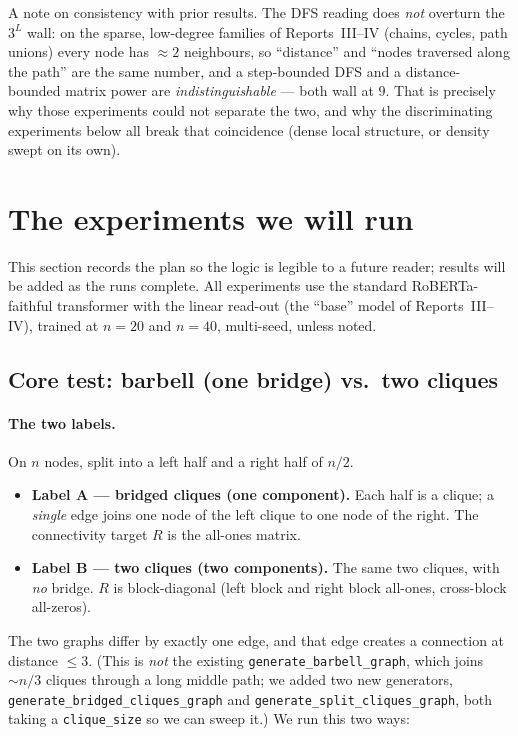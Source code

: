 \documentclass[11pt,a4paper]{article}
\begin{document}
A note on consistency with prior results. The DFS reading does \emph{not} overturn the $3^L$
wall: on the sparse, low-degree families of Reports~III--IV (chains, cycles, path unions) every
node has $\approx 2$ neighbours, so ``distance'' and ``nodes traversed along the path'' are the
same number, and a step-bounded DFS and a distance-bounded matrix power are
\emph{indistinguishable} --- both wall at $9$. That is precisely why those experiments could not
separate the two, and why the discriminating experiments below all break that coincidence
(dense local structure, or density swept on its own).

\section{The experiments we will run}
\label{sec:plan}

This section records the plan so the logic is legible to a future reader; results will be added
as the runs complete. All experiments use the standard RoBERTa-faithful transformer with the
linear read-out (the ``base'' model of Reports~III--IV), trained at $n=20$ and $n=40$, multi-seed,
unless noted.

\subsection{Core test: barbell (one bridge) vs.\ two cliques}
\label{sec:plan-barbell}

\paragraph{The two labels.} On $n$ nodes, split into a left half and a right half of $n/2$.
\begin{itemize}\setlength\itemsep{0.1em}
  \item \textbf{Label A --- bridged cliques (one component).} Each half is a clique; a
        \emph{single} edge joins one node of the left clique to one node of the right. The
        connectivity target $R$ is the all-ones matrix.
  \item \textbf{Label B --- two cliques (two components).} The same two cliques, with
        \emph{no} bridge. $R$ is block-diagonal (left block and right block all-ones,
        cross-block all-zeros).
\end{itemize}
The two graphs differ by exactly one edge, and that edge creates a connection at distance
$\le 3$. (This is \emph{not} the existing \texttt{generate\_barbell\_graph}, which joins
$\sim n/3$ cliques through a long middle path; we added two new generators,
\texttt{generate\_bridged\_cliques\_graph} and \texttt{generate\_split\_cliques\_graph}, both
taking a \texttt{clique\_size} so we can sweep it.) We run this two ways:
\end{document}

